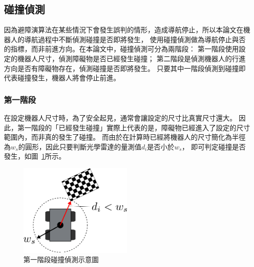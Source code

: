 \subsection{碰撞偵測}
因為避障演算法在某些情況下會發生誤判的情形，造成導航停止，所以本論文在機器人的導航過程中不斷偵測碰撞是否即將發生，
使用碰撞偵測做為導航停止與否的指標，而非前進方向。在本論文中，碰撞偵測可分為兩階段：
第一階段使用設定的機器人尺寸，偵測障礙物是否已經發生碰撞；
第二階段是偵測機器人的行進方向是否有障礙物存在，偵測碰撞是否即將發生。
只要其中一階段偵測到碰撞即代表碰撞發生，機器人將會停止前進。

\subsubsection{第一階段}
在設定機器人尺寸時，為了安全起見，通常會讓設定的尺寸比真實尺寸還大。
因此，第一階段的「已經發生碰撞」實際上代表的是，障礙物已經進入了設定的尺寸範圍內，而非真的發生了碰撞。
而由於在計算時已經將機器人的尺寸簡化為半徑為$w_s$的圓形，因此只要判斷光學雷達的量測值$d_i$是否小於$w_s$，
即可判定碰撞是否發生，如圖~\ref{f:collision_1stage}所示。
\begin{figure}[h!]
	\centering
	\includegraphics[width=0.5\textwidth]{figures/collision_1stage}
	\caption{第一階段碰撞偵測示意圖}
	\label{f:collision_1stage}
\end{figure}

